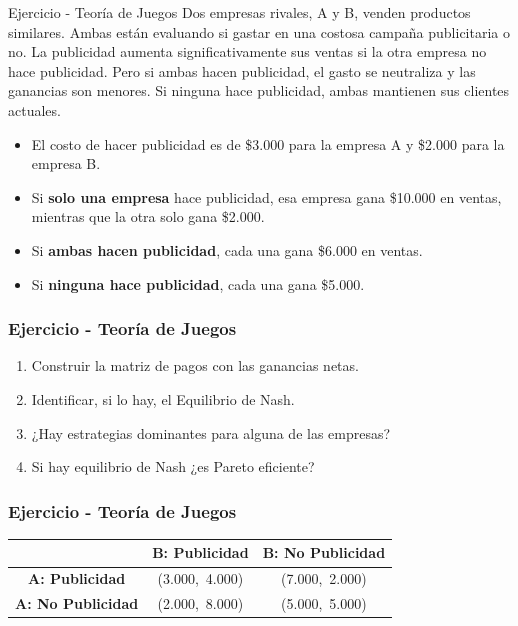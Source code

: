 \documentclass{beamer}
\begin{document}
\begin{frame}{Ejercicio - Teoría de Juegos}
Dos empresas rivales, A y B, venden productos similares. Ambas están evaluando si gastar en una costosa campaña publicitaria o no. La publicidad aumenta significativamente sus ventas si la otra empresa no hace publicidad. Pero si ambas hacen publicidad, el gasto se neutraliza y las ganancias son menores. Si ninguna hace publicidad, ambas mantienen sus clientes actuales.
    \begin{itemize}
        \item El costo de hacer publicidad es de \$3.000 para la empresa A y \$2.000 para la empresa B.
        \item Si \textbf{solo una empresa} hace publicidad, esa empresa gana \$10.000 en ventas, mientras que la otra solo gana \$2.000.
        \item Si \textbf{ambas hacen publicidad}, cada una gana \$6.000 en ventas.
        \item Si \textbf{ninguna hace publicidad}, cada una gana \$5.000.
    \end{itemize}
\end{frame}

\begin{frame}
\frametitle{Ejercicio - Teoría de Juegos}
\begin{enumerate}
    \item Construir la matriz de pagos con las ganancias netas.
    \item Identificar, si lo hay, el Equilibrio de Nash.
    \item ¿Hay estrategias dominantes para alguna de las empresas?
    \item Si hay equilibrio de Nash ¿es Pareto eficiente?
\end{enumerate}
\end{frame}

\begin{frame}
\frametitle{Ejercicio - Teoría de Juegos}
\begin{center}
\renewcommand{\arraystretch}{1.8} %
\begin{tabular}{c|c|c}
 & \textbf{B: Publicidad} & \textbf{B: No Publicidad} \\
\hline
\textbf{A: Publicidad} & (3.000,\ 4.000) & (7.000,\ 2.000) \\
\textbf{A: No Publicidad} & (2.000,\ 8.000) & (5.000,\ 5.000) \\
\end{tabular}
\end{center}
\end{frame}
\end{document}
